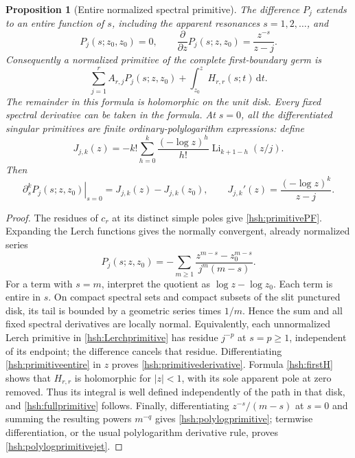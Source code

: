 \documentclass[11pt,a4paper]{article}
\numberwithin{equation}{section}
\newtheorem{proposition}[theorem]{Proposition}
\theoremstyle{definition}
\theoremstyle{remark}
\begin{document}
\begin{proposition}[Entire normalized spectral primitive]
\label{hsh:primitive}
The difference $P_j$ extends to an entire function of $s$, including
the apparent resonances $s=1,2,\ldots$, and
\begin{equation}\label{hsh:primitivederivative}
 P_j(s;z_0,z_0)=0,\qquad
 \frac{\partial}{\partial z}P_j(s;z,z_0)=\frac{z^{-s}}{z-j}.
\end{equation}
Consequently a normalized primitive of the complete first-boundary germ is
\begin{equation}\label{hsh:fullprimitive}
 \sum_{j=1}^{r}A_{r,j}P_j(s;z,z_0)
                   +\int_{z_0}^{z}H_{r,r}(s;t)\,\mathrm dt.
\end{equation}
The remainder in this formula is holomorphic on the unit disk.
Every fixed spectral derivative can be taken in the formula.
At $s=0$, all the differentiated singular primitives are finite
ordinary-polylogarithm expressions: define
\begin{equation}\label{hsh:polylogprimitive}
 J_{j,k}(z)=-k!\sum_{h=0}^{k}\frac{(-\log z)^h}{h!}
                          \operatorname{Li}_{k+1-h}(z/j).
\end{equation}
Then
\begin{equation}\label{hsh:polylogprimitivejet}
 \left.\partial_s^kP_j(s;z,z_0)\right|_{s=0}
                         =J_{j,k}(z)-J_{j,k}(z_0),
 \qquad J_{j,k}'(z)=\frac{(-\log z)^k}{z-j}.
\end{equation}
\end{proposition}

\begin{proof}
The residues of $c_r$ at its distinct simple poles give
\eqref{hsh:primitivePF}.  Expanding the Lerch functions gives the
normally convergent, already normalized series
\begin{equation}\label{hsh:primitiveentire}
 P_j(s;z,z_0)=
 -\sum_{m\geq1}\frac{z^{m-s}-z_0^{m-s}}{j^m(m-s)}.
\end{equation}
For a term with $s=m$, interpret the quotient as
$\log z-\log z_0$.  Each term is entire in $s$.  On compact
spectral sets and compact subsets of the slit punctured disk, its tail
is bounded by a geometric series times $1/m$.  Hence the sum and all
fixed spectral derivatives are locally normal.  Equivalently, each
unnormalized Lerch primitive in \eqref{hsh:Lerchprimitive} has residue
$j^{-p}$ at $s=p\geq1$, independent of its endpoint; the difference
cancels that residue.  Differentiating \eqref{hsh:primitiveentire}
in $z$ proves \eqref{hsh:primitivederivative}.  Formula
\eqref{hsh:firstH} shows that $H_{r,r}$ is holomorphic for $|z|<1$,
with its sole apparent pole at zero removed.  Thus its integral is
well defined independently of the path in that disk, and
\eqref{hsh:fullprimitive} follows.  Finally, differentiating
$z^{-s}/(m-s)$ at $s=0$ and summing the resulting powers $m^{-q}$
gives \eqref{hsh:polylogprimitive}; termwise differentiation, or the
usual polylogarithm derivative rule, proves
\eqref{hsh:polylogprimitivejet}.
\end{proof}
\end{document}
